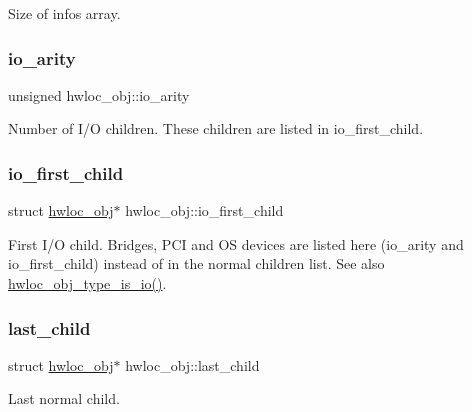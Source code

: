 Size of infos array. 

\mbox{\label{a00238_a7b3b29f0be377c7d2d52262019fc7d11}} 
\subsubsection{\texorpdfstring{io\+\_\+arity}{io\_arity}}
{\footnotesize\ttfamily unsigned hwloc\+\_\+obj\+::io\+\_\+arity}



Number of I/O children. These children are listed in {\ttfamily io\+\_\+first\+\_\+child}. 

\mbox{\label{a00238_a8d14c88e1ebc4ae67cc69f9e928558b3}} 
\subsubsection{\texorpdfstring{io\+\_\+first\+\_\+child}{io\_first\_child}}
{\footnotesize\ttfamily struct \hyperlink{a00238}{hwloc\+\_\+obj}$\ast$ hwloc\+\_\+obj\+::io\+\_\+first\+\_\+child}



First I/O child. Bridges, P\+CI and OS devices are listed here ({\ttfamily io\+\_\+arity} and {\ttfamily io\+\_\+first\+\_\+child}) instead of in the normal children list. See also \hyperlink{a00198_gac8a954ed37a4376097234c828068cbef}{hwloc\+\_\+obj\+\_\+type\+\_\+is\+\_\+io()}. 

\mbox{\label{a00238_a84bd65634dbc55f4158b74443a9bd04f}} 
\subsubsection{\texorpdfstring{last\+\_\+child}{last\_child}}
{\footnotesize\ttfamily struct \hyperlink{a00238}{hwloc\+\_\+obj}$\ast$ hwloc\+\_\+obj\+::last\+\_\+child}



Last normal child. 

\mbox{\label{a00238_a0d07fb7b8935e137c94d75a3eb492ae9}} 
